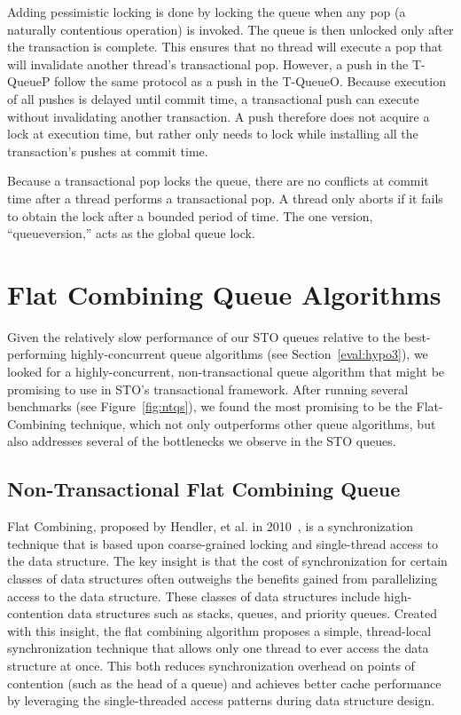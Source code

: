 Adding pessimistic locking is done by locking the queue when any pop (a naturally contentious operation) is invoked. The queue is then unlocked only after the transaction is complete. This ensures that no thread will execute a pop that will invalidate another thread's transactional pop. However, a push in the T-QueueP follow the same protocol as a push in the T-QueueO. Because execution of all pushes is delayed until commit time, a transactional push can execute without invalidating another transaction. A push therefore does not acquire a lock at execution time, but rather only needs to lock while installing all the transaction's pushes at commit time. 

Because a transactional pop locks the queue, there are no conflicts at commit time after a thread performs a transactional pop. A thread only aborts if it fails to obtain the lock after a bounded period of time. The one version, ``queueversion,'' acts as the global queue lock. 


\section{Flat Combining Queue Algorithms}
Given the relatively slow performance of our STO queues relative to the best-performing highly-concurrent queue algorithms (see Section~\ref{eval:hypo3}), we looked for a highly-concurrent, non-transactional queue algorithm that might be promising to use in STO's transactional framework. After running several benchmarks (see Figure~\ref{fig:ntqs}), we found the most promising to be the Flat-Combining technique, which not only outperforms other queue algorithms, but also addresses several of the bottlenecks we observe in the STO queues.

\subsection{Non-Transactional Flat Combining Queue}
\label{fcqueuent}

Flat Combining, proposed by Hendler, et al. in 2010~\cite{flatcombining}, is a synchronization technique that is based upon coarse-grained locking and single-thread access to the data structure. The key insight is that the cost of synchronization for certain classes of data structures often outweighs the benefits gained from parallelizing access to the data structure. These classes of data structures include high-contention data structures such as stacks, queues, and priority queues. Created with this insight, the flat combining algorithm proposes a simple, thread-local synchronization technique that allows only one thread to ever access the data structure at once. This both reduces synchronization overhead on points of contention (such as the head of a queue) and achieves better cache performance by leveraging the single-threaded access patterns during data structure design.

